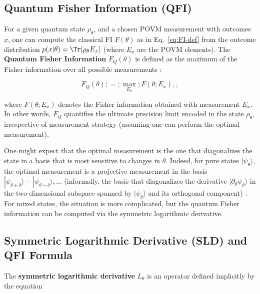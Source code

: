 \subsection{Quantum Fisher Information (QFI)}



For a given quantum state $\rho_\theta$, and a chosen POVM measurement
with outcomes $x$, one can compute the classical FI $F(\theta)$ as in
Eq.~\eqref{eq:FI-def} from the outcome distribution $p(x|\theta) =
\Tr[\rho_\theta E_x]$ (where ${E_x}$ are the POVM elements). The
\textbf{Quantum Fisher Information} $F_Q(\theta)$ is defined as the
maximum of the Fisher information over all possible measurements
\cite{BraunsteinCaves1994}:

\begin{equation}

F_Q(\theta) ;=; \max_{{E_x}} ; F(\theta;{E_x}) ,,

\end{equation}

where $F(\theta;{E_x})$ denotes the Fisher information obtained with
measurement ${E_x}$. In other words, $F_Q$ quantifies the ultimate
precision limit encoded in the state $\rho_\theta$, irrespective of
measurement strategy (assuming one can perform the optimal
measurement).



One might expect that the optimal measurement is the one that
diagonalizes the state in a basis that is most sensitive to changes in
$\theta$. Indeed, for pure states $|\psi_\theta\rangle$, the optimal
measurement is a projective measurement in the basis
${|\psi_{\theta+\delta}\rangle - |\psi_{\theta-\delta}\rangle,
  \ldots}$ (informally, the basis that diagonalizes the derivative
$|\partial_\theta \psi_\theta\rangle$ in the two-dimensional subspace
spanned by $|\psi_\theta\rangle$ and its orthogonal component)
\cite{BraunsteinCaves1994}. For mixed states, the situation is more
complicated, but the quantum Fisher information can be computed via
the symmetric logarithmic derivative.



\subsection{Symmetric Logarithmic Derivative (SLD) and QFI Formula}



The \textbf{symmetric logarithmic derivative} $L_\theta$ is an operator defined implicitly by the equation

